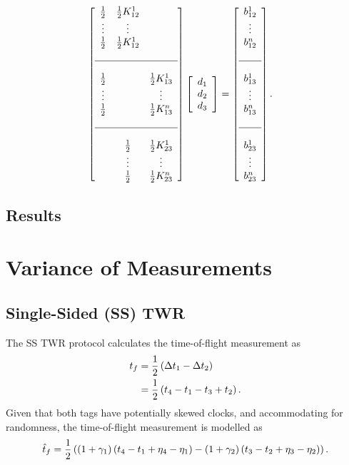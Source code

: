 \documentclass{decar-wsd}    %
\begin{document}
\begin{align}
    \bma{ccc} \f{1}{2} & \f{1}{2}K^1_{12} &  \\ \vdots & \vdots &  \\ \f{1}{2} & \f{1}{2}K^1_{12} & \\ \\ \hline \\ \f{1}{2} & & \f{1}{2}K^1_{13} \\ \vdots &  & \vdots \\ \f{1}{2} & & \f{1}{2}K^n_{13} \\ \\ \hline \\ & \f{1}{2} & \f{1}{2}K^1_{23} \\ & \vdots & \vdots \\ & \f{1}{2} & \f{1}{2}K^n_{23} \ema \bma{c} d_1 \\ d_2 \\ d_3 \ema &= \bma{c} b_{12}^1 \\ \vdots \\ b_{12}^n \\ \\ \hline \\ b_{13}^1 \\ \vdots \\ b_{13}^n \\ \\ \hline \\ b_{23}^1 \\ \vdots \\ b_{23}^n \ema.
\end{align}

\subsection{Results}



\section{Variance of Measurements}

\subsection{Single-Sided (SS) TWR}

The SS TWR protocol calculates the time-of-flight measurement as
\begin{align}
    t_f &= \f{1}{2}\left( \Delta t_1 - \Delta t_2 \right) \\
    &= \f{1}{2} \left( t_4 - t_1 - t_3 + t_2 \right).
\end{align}
Given that both tags have potentially skewed clocks, and accommodating for randomness, the time-of-flight measurement is modelled as
\begin{align}
    \hat{t}_f = \f{1}{2} \left( \left( 1 + \gamma_1\right) \left( t_4 - t_1 + \eta_4 - \eta_1 \right) - \left( 1 + \gamma_2\right) \left( t_3 - t_2 + \eta_3 - \eta_2 \right) \right).
\end{align}
\end{document}
